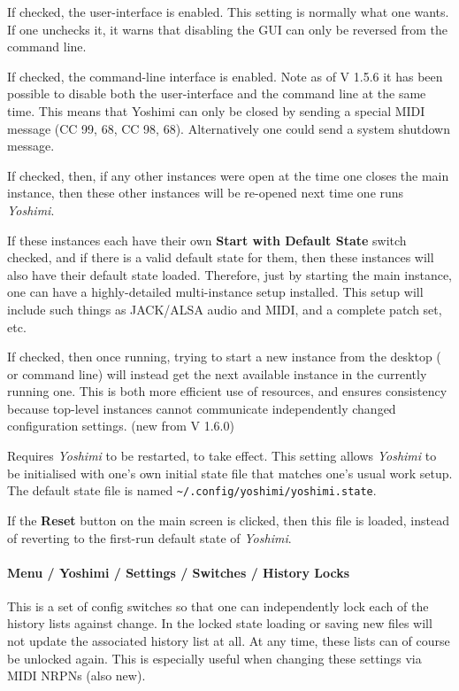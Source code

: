    If checked, the user-interface is enabled.  This setting is normally what one
   wants.  If one unchecks it, it warns that disabling the GUI
   can only be reversed from the command line.

   If checked, the command-line interface is enabled.
   Note as of V 1.5.6 it has been possible to disable both the user-interface and
   the command line at the same time. This means that Yoshimi can only be closed
   by sending a special MIDI message (CC 99, 68, CC 98, 68). Alternatively one
   could send a system shutdown message.

      If checked, then, if any other instances were open at the time one closes
      the main instance, then these other instances will be re-opened next time
      one runs \textsl{Yoshimi}.

   If these instances each have their own
   \textbf{Start with Default State} switch checked, and if
   there is a valid default state for them, then these instances will also have
   their default state loaded.
   Therefore, just by starting the main instance, one can have a
   highly-detailed multi-instance setup installed.
   This setup will include such things as JACK/ALSA audio
   and MIDI, and a complete patch set, etc.

      If checked, then once running, trying to start a new instance from the
      desktop ( or command line) will instead get the next available instance in
      the currently running one. This is both more efficient use of resources,
      and ensures consistency because top-level instances cannot communicate
      independently changed configuration settings. (new from V 1.6.0)

   Requires \textsl{Yoshimi} to be restarted, to take effect.
   This setting allows \textsl{Yoshimi} to be initialised with one's own
   initial state file that matches one's usual work setup.
   The default state file is named
   \texttt{\textasciitilde/.config/yoshimi/yoshimi.state}.

   If the \textbf{Reset} button on the main screen is clicked, then this file
   is loaded, instead of reverting to the first-run default state of
   \textsl{Yoshimi}.

   \paragraph{Menu / Yoshimi / Settings / Switches / History Locks}
   \label{paragraph:menu_yoshimi_settings_historylocks}
   This is a set of config switches so that one can independently lock each of
   the history lists against change. In the locked state loading or saving new
   files will not update the associated history list at all. At any time, these
   lists can of course be unlocked again. This is especially useful when changing
   these settings via MIDI NRPNs (also new).

